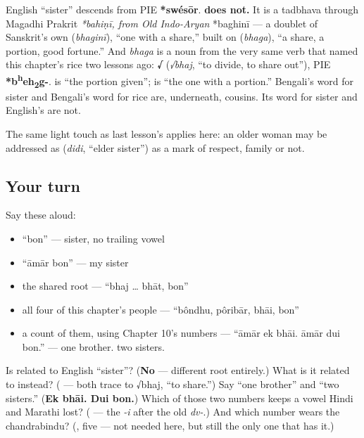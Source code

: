 \begin{cousinweb}
English \textquotedblleft{}sister\textquotedblright{} descends from PIE \textbf{*swésōr}. \textbf{ does not.} It is a tadbhava through Magadhi Prakrit \emph{*bahiṇī, from Old Indo-Aryan }*baghinī — a doublet of Sanskrit's own \textbf{} (\emph{bhaginī}), \textquotedblleft{}one with a share,\textquotedblright{} built on \textbf{} (\emph{bhaga}), \textquotedblleft{}a share, a portion, good fortune.\textquotedblright{} And \emph{bhaga} is a noun from the very same verb that named this chapter's rice two lessons ago: \textbf{√} (\emph{√bhaj}, \textquotedblleft{}to divide, to share out\textquotedblright{}), PIE \textbf{*b\textsuperscript{h}eh\textsubscript{2}g-}.  is \textquotedblleft{}the portion given\textquotedblright{};  is \textquotedblleft{}the one with a portion.\textquotedblright{} Bengali's word for sister and Bengali's word for rice are, underneath, cousins. Its word for sister and English's are not.

The same light touch as last lesson's  applies here: an older woman may be addressed as \textbf{} (\emph{didi}, \textquotedblleft{}elder sister\textquotedblright{}) as a mark of respect, family or not.
\end{cousinweb}

\subsection*{Your turn}
Say these aloud:

\begin{itemize}
\raggedright
  \item \textquotedblleft{}bon\textquotedblright{} — sister, no trailing vowel
  \item \textquotedblleft{}āmār bon\textquotedblright{} — my sister
  \item the shared root — \textquotedblleft{}bhaj … bhāt, bon\textquotedblright{}
  \item all four of this chapter's people — \textquotedblleft{}bôndhu, pôribār, bhāi, bon\textquotedblright{}
  \item a count of them, using Chapter 10's numbers — \textquotedblleft{}āmār ek bhāi. āmār dui bon.\textquotedblright{} — one brother. two sisters.
\end{itemize}

\begin{tcolorbox}[breakable,colback=teal!4,colframe=teal!35!black,title={Before you move on}]
Is  related to English \textquotedblleft{}sister\textquotedblright{}? (\textbf{No} — different root entirely.) What is it related to instead? (\textbf{} — both trace to √bhaj, \textquotedblleft{}to share.\textquotedblright{}) Say \textquotedblleft{}one brother\textquotedblright{} and \textquotedblleft{}two sisters.\textquotedblright{} (\textbf{Ek bhāi. Dui bon.}) Which of those two numbers keeps a vowel Hindi and Marathi lost? (\textbf{} — the \emph{-i} after the old \emph{dv-}.) And which number wears the chandrabindu? (\textbf{}, five — not needed here, but still the only one that has it.)
\end{tcolorbox}
